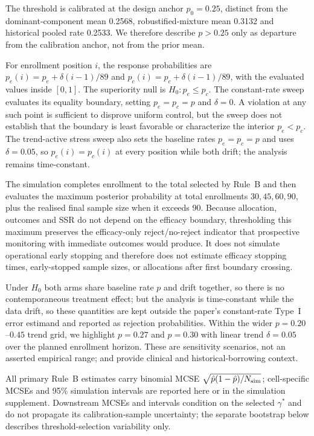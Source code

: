 \documentclass[11pt]{article}
\begin{document}
The threshold is calibrated at the design anchor $p_0=0.25$, distinct from the
dominant-component mean 0.2568, robustified-mixture mean 0.3132 and historical
pooled rate 0.2533.  We therefore describe $p>0.25$ only as departure from the
calibration anchor, not from the prior mean.

For enrollment position $i$, the response probabilities are
$p_e(i)=p_e+\delta(i-1)/89$ and $p_c(i)=p_c+\delta(i-1)/89$, with the evaluated
values inside $[0,1]$.  The superiority null is $H_0:p_e\leq p_c$.  The
constant-rate sweep evaluates its equality boundary, setting $p_e=p_c=p$ and
$\delta=0$.  A violation at any such point is sufficient to disprove uniform
control, but the sweep does not establish that the boundary is least favorable
or characterize the interior $p_e<p_c$.  The trend-active stress sweep also sets
the baseline rates $p_e=p_c=p$ and uses $\delta=0.05$, so
$p_e(i)=p_c(i)$ at every position while both drift; the analysis remains
time-constant.

The simulation completes enrollment to the total selected by Rule~B and then
evaluates the maximum posterior probability at total enrollments
$30,45,60,90$, plus the realised final sample size when it exceeds 90.
Because allocation,
outcomes and SSR do not depend on the efficacy boundary, thresholding this
maximum preserves the efficacy-only reject/no-reject indicator that prospective
monitoring with immediate outcomes would produce.  It does not simulate
operational early stopping and therefore does not estimate efficacy stopping
times, early-stopped sample sizes, or allocations after first boundary crossing.

Under $H_0$ both arms share baseline rate $p$ and drift together, so there is
no contemporaneous treatment effect; but the analysis is time-constant while the
data drift, so these quantities are kept outside the paper's constant-rate
Type~I error estimand and reported as rejection probabilities.  Within the wider $p=0.20$--$0.45$ trend grid,
we highlight $p=0.27$ and $p=0.30$ with linear trend $\delta=0.05$ over the
planned enrollment horizon.  These are sensitivity scenarios, not an asserted
empirical range; \citet{tang_2010} and
\citet{viele_2014} provide clinical and historical-borrowing context.

All primary Rule~B estimates carry binomial MCSE
$\sqrt{\hat p(1-\hat p)/N_{\rm sim}}$; cell-specific MCSEs and 95\% simulation
intervals are reported here or in the simulation supplement.  Downstream MCSEs
and intervals condition on the selected $\gamma^*$ and do not propagate its
calibration-sample uncertainty; the separate bootstrap below describes
threshold-selection variability only.
\end{document}
